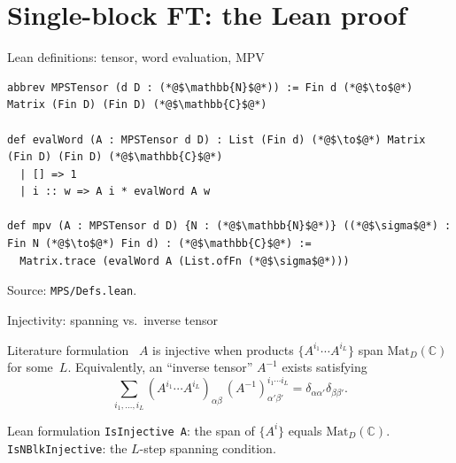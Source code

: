 \documentclass[aspectratio=169,10pt]{beamer}
\newcommand{\Mat}{\mathrm{Mat}}
\begin{document}
\section{Single-block FT: the Lean proof}

\begin{frame}[fragile]{Lean definitions: tensor, word evaluation, MPV}
    \vspace{-0.65em}

    \begin{lstlisting}
abbrev MPSTensor (d D : (*@$\mathbb{N}$@*)) := Fin d (*@$\to$@*) Matrix (Fin D) (Fin D) (*@$\mathbb{C}$@*)

def evalWord (A : MPSTensor d D) : List (Fin d) (*@$\to$@*) Matrix (Fin D) (Fin D) (*@$\mathbb{C}$@*)
  | [] => 1
  | i :: w => A i * evalWord A w

def mpv (A : MPSTensor d D) {N : (*@$\mathbb{N}$@*)} ((*@$\sigma$@*) : Fin N (*@$\to$@*) Fin d) : (*@$\mathbb{C}$@*) :=
  Matrix.trace (evalWord A (List.ofFn (*@$\sigma$@*)))
\end{lstlisting}

    \vspace{-0.2em}
    \textcolor{dimwhite}{\footnotesize Source: \texttt{MPS/Defs.lean}.}
\end{frame}

\begin{frame}{Injectivity: spanning vs.\ inverse tensor}
    \vspace{-0.6em}

    \begin{block}{Literature formulation~\cite{Cirac2017Annals,Perez-Garcia2007Matrix}}
        $A$ is injective when products $\{A^{i_1}\cdots A^{i_L}\}$ span $\Mat_D(\mathbb{C})$
        for some~$L$.
        Equivalently, an ``inverse tensor'' $A^{-1}$ exists satisfying
        \[
            \sum_{i_1,\ldots,i_L} (A^{i_1}\cdots A^{i_L})_{\alpha\beta}\,(A^{-1})^{i_1\cdots i_L}_{\alpha'\beta'}
            = \delta_{\alpha\alpha'}\delta_{\beta\beta'}.
        \]
    \end{block}

    \begin{block}{Lean formulation}
        \texttt{IsInjective A}: the span of $\{A^i\}$ equals $\Mat_D(\mathbb{C})$.\\
        \texttt{IsNBlkInjective}: the $L$-step spanning condition.
    \end{block}
\end{frame}
\end{document}
